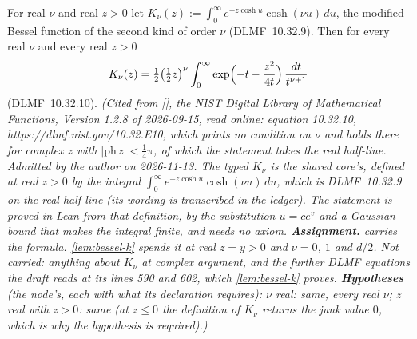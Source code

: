 \begin{theorem}
\label{thm:cited-A51}
\leanok
For real $\nu$ and real $z > 0$ let
$K_\nu(z) := \int_0^\infty e^{-z\cosh u}\cosh(\nu u)\,du$, the modified Bessel function of the
second kind of order $\nu$ (DLMF~10.32.9). Then for every real $\nu$ and every real $z > 0$
\[
  K_\nu(z) = \tfrac12\bigl(\tfrac12 z\bigr)^{\nu}\int_0^\infty
  \exp\Bigl(-t - \frac{z^2}{4t}\Bigr)\,\frac{dt}{t^{\nu+1}}
\]
(DLMF~10.32.10).
\statusA\quad{}\quad\emph{(Cited from [], the NIST Digital Library of
Mathematical Functions, Version 1.2.8 of 2026-09-15, read online: equation 10.32.10,
https://dlmf.nist.gov/10.32.E10, which prints no condition on $\nu$ and holds there for complex
$z$ with $|\mathrm{ph}\,z| < \tfrac14\pi$, of which the statement takes the real half-line.
Admitted by the author on 2026-11-13. The typed $K_\nu$ is the shared core's, defined at real
$z > 0$ by the integral $\int_0^\infty e^{-z\cosh u}\cosh(\nu u)\,du$, which is DLMF~10.32.9 on the
real half-line (its wording is transcribed in the ledger). The statement is proved in Lean from
that definition, by the substitution $u = c e^{v}$ and a Gaussian bound that makes the integral
finite, and needs no axiom.
\textbf{Assignment.}  carries the formula. \ref{lem:bessel-k} spends it at real
$z = y > 0$ and $\nu = 0$, $1$ and $d/2$. Not carried: anything about $K_\nu$ at complex argument,
and the further DLMF equations the draft reads at its lines 590 and 602, which
\ref{lem:bessel-k} proves.
\textbf{Hypotheses} (the node's, each with what its declaration requires): $\nu$ real: same, every real
$\nu$; $z$ real with $z > 0$: same (at $z \le 0$ the definition of $K_\nu$ returns the junk value
$0$, which is why the hypothesis is required).)}
\end{theorem}
